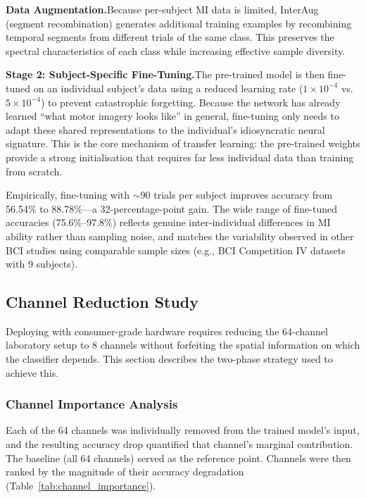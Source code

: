 \documentclass[12pt, a4paper]{article}
\begin{document}
\textbf{Data Augmentation.}\quad Because per-subject MI data is limited, InterAug (segment recombination) generates additional training examples by recombining temporal segments from different trials of the same class. This preserves the spectral characteristics of each class while increasing effective sample diversity.

\textbf{Stage 2: Subject-Specific Fine-Tuning.}\quad The pre-trained model is then fine-tuned on an individual subject's data using a reduced learning rate ($1 \times 10^{-4}$ vs.\ $5 \times 10^{-4}$) to prevent catastrophic forgetting. Because the network has already learned ``what motor imagery looks like'' in general, fine-tuning only needs to adapt these shared representations to the individual's idiosyncratic neural signature. This is the core mechanism of transfer learning: the pre-trained weights provide a strong initialisation that requires far less individual data than training from scratch.

Empirically, fine-tuning with $\sim$90 trials per subject improves accuracy from 56.54\% to 88.78\%---a 32-percentage-point gain. The wide range of fine-tuned accuracies (75.6\%--97.8\%) reflects genuine inter-individual differences in MI ability rather than sampling noise, and matches the variability observed in other BCI studies using comparable sample sizes (e.g., BCI Competition IV datasets with 9 subjects).

\subsection{Channel Reduction Study}

Deploying with consumer-grade hardware requires reducing the 64-channel laboratory setup to 8 channels without forfeiting the spatial information on which the classifier depends. This section describes the two-phase strategy used to achieve this.

\subsubsection{Channel Importance Analysis}

Each of the 64 channels was individually removed from the trained model's input, and the resulting accuracy drop quantified that channel's marginal contribution. The baseline (all 64 channels) served as the reference point. Channels were then ranked by the magnitude of their accuracy degradation (Table~\ref{tab:channel_importance}).
\end{document}
